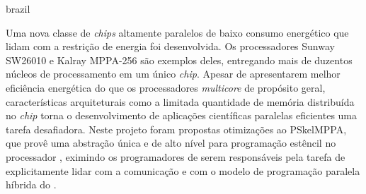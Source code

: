 \swapcontents
{
    \begin{otherlanguage*}{brazil}
    \begin{resumo}[Resumo]

        Uma nova classe de \textit{chips} altamente paralelos de baixo consumo energético que lidam com a restrição de energia foi desenvolvida. Os processadores Sunway SW26010 e Kalray MPPA-256 são exemplos deles, entregando mais de duzentos núcleos de processamento em um único \textit{chip}. Apesar de apresentarem melhor eficiência energética do que os processadores \textit{multicore} de propósito geral, características arquiteturais como a limitada quantidade de memória distribuída no \textit{chip} torna o desenvolvimento de aplicações científicas paralelas eficientes uma tarefa desafiadora. Neste projeto foram propostas otimizações ao \fw PSkelMPPA, que provê uma abstração única e de alto nível para programação estêncil no processador \mppa, eximindo os programadores de serem responsáveis pela tarefa de explicitamente lidar com a comunicação e com o modelo de programação paralela híbrida do \mppa.


    \end{resumo}
    \end{otherlanguage*}
}


